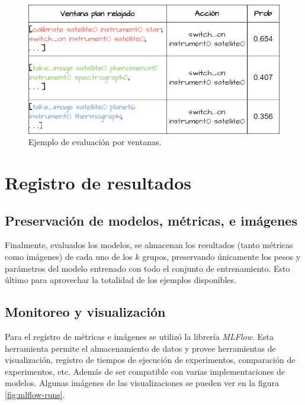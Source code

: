 \begin{figure}[t!]
    \centering
    \includegraphics[width=\linewidth]{figures/aggregation_example.png}
    \caption{Ejemplo de evaluación por ventanas.}
    \label{fig:window_example_evaluation}
\end{figure}

\section{Registro de resultados}

\subsection{Preservación de modelos, métricas, e imágenes}

Finalmente, evaluados los modelos, se almacenan los resultados (tanto métricas
como imágenes) de cada uno de los $k$ grupos, preservando únicamente los pesos y
parámetros del modelo entrenado con todo el conjunto de entrenamiento. Esto
último para aprovechar la totalidad de los ejemplos disponibles.

\subsection{Monitoreo y visualización}

Para el registro de métricas e imágenes se utilizó la librería \emph{MLFlow}.
 Esta herramienta permite el almacenamiento de datos y provee herramientas de
 visualización, registro de tiempos de ejecución de experimentos, comparación de
 experimentos, etc. Además de ser compatible con varias implementaciones de
 modelos. Algunas imágenes de las visualizaciones se pueden ver en la figura
 \ref{fig:mlflow-runs}.

